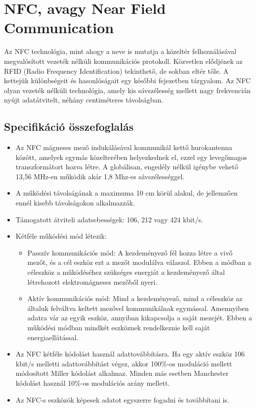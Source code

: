\documentclass[12pt]{article}
\begin{document}
\section[NFC]{NFC, avagy Near Field Communication}
Az NFC technológia, mint ahogy a neve is mutatja a közeltér felhsználásával
megvalósított vezeték nélküli kommunikációs protokoll. Közvetlen elődjének az
RFID (Radio Frequency Identification) tekinthető, de sokban eltér tőle. A 
kettejük különbségeit és hasonlóságait egy későbbi fejezetben tárgyalom.
Az NFC olyan vezeték nélküli technológia, amely kis sávszélesség mellett
nagy frekvencián nyújt adatátvitelt, néhány centiméteres távolságban.

\subsection{Specifikáció összefoglalás}
\begin{itemize}
\item Az NFC mágneses mező indukálásával kommunikál kettő hurokantenna között,
amelyek egymás közelterében  helyezkednek el, ezzel egy levegőmagos
transzformátort hozva létre. A globálisan, engedély nélkül igénybe vehető 
13,56 MHz-en működik akár 1,8 Mhz-es sávszélességgel.
\item A működési távolságának a maximuma 10 cm körül alakul, de jellemzően ennél
kisebb távolságokon alkalmazzák.
\item Támogatott átviteli adatsebességek: 106, 212 vagy 424 kbit/s.
\item Kétféle működési mód létezik:
\begin{itemize}
\item Passzív kommunikációs mód: A kezdeményező fél hozza létre a vivő mezőt, és a
cél eszköz ezt a mezőt modulálva válaszol. Ebben a módban a céleszköz a 
működéséhez szükséges energiát a kezdeményező által létrehozott elektromágneses
mezőből nyeri.
\item Aktív kommunikációs mód: Mind a kezdeményező, mind a céleszköz az általuk
felváltva keltett mezővel kommunikálnak egymással. 
Amennyiben adatra vár az egyik eszköz,
annyiban kikapcsolja a saját mezejét. Ebben a működési módban mindkét eszköznek
rendelkeznie kell saját energiaellátással.
\end{itemize}
\item Az NFC kétféle kódolást használ adattovábbításra. Ha egy aktív eszköz 
106 kbit/s melletti adattovábbítást végez, akkor 100\%-os moduláció mellett
módosított Miller kódolást alkalmaz. Minden más esetben Manchester kódolást
használ 10\%-os modulációs arány mellett.
\item Az NFC-s eszközök képesek adatot egyszerre fogadni és továbbítani is. 
\end{itemize}
\end{document}
